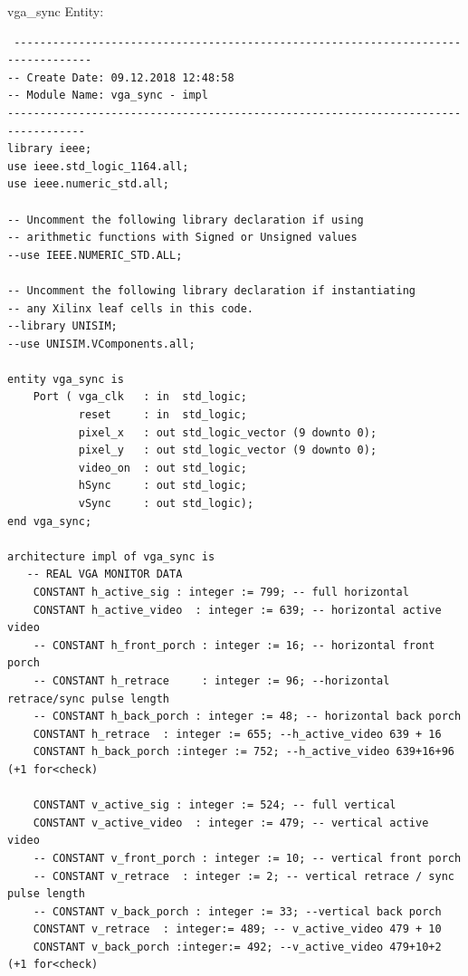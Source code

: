 vga\_sync Entity:
\begin{verbatim}
 ----------------------------------------------------------------------------------
-- Create Date: 09.12.2018 12:48:58
-- Module Name: vga_sync - impl
----------------------------------------------------------------------------------
library ieee;
use ieee.std_logic_1164.all;
use ieee.numeric_std.all;

-- Uncomment the following library declaration if using
-- arithmetic functions with Signed or Unsigned values
--use IEEE.NUMERIC_STD.ALL;

-- Uncomment the following library declaration if instantiating
-- any Xilinx leaf cells in this code.
--library UNISIM;
--use UNISIM.VComponents.all;

entity vga_sync is
    Port ( vga_clk   : in  std_logic;
           reset     : in  std_logic;
           pixel_x   : out std_logic_vector (9 downto 0);
           pixel_y   : out std_logic_vector (9 downto 0);
           video_on  : out std_logic;
           hSync     : out std_logic;
           vSync     : out std_logic);
end vga_sync;

architecture impl of vga_sync is
   -- REAL VGA MONITOR DATA 
    CONSTANT h_active_sig : integer := 799; -- full horizontal
    CONSTANT h_active_video  : integer := 639; -- horizontal active video
    -- CONSTANT h_front_porch : integer := 16; -- horizontal front porch
    -- CONSTANT h_retrace     : integer := 96; --horizontal retrace/sync pulse length
    -- CONSTANT h_back_porch : integer := 48; -- horizontal back porch
    CONSTANT h_retrace  : integer := 655; --h_active_video 639 + 16
    CONSTANT h_back_porch :integer := 752; --h_active_video 639+16+96 (+1 for<check)
    
    CONSTANT v_active_sig : integer := 524; -- full vertical
    CONSTANT v_active_video  : integer := 479; -- vertical active video
    -- CONSTANT v_front_porch : integer := 10; -- vertical front porch
    -- CONSTANT v_retrace  : integer := 2; -- vertical retrace / sync pulse length
    -- CONSTANT v_back_porch : integer := 33; --vertical back porch
    CONSTANT v_retrace  : integer:= 489; -- v_active_video 479 + 10
    CONSTANT v_back_porch :integer:= 492; --v_active_video 479+10+2 (+1 for<check)
   

\end{verbatim}
